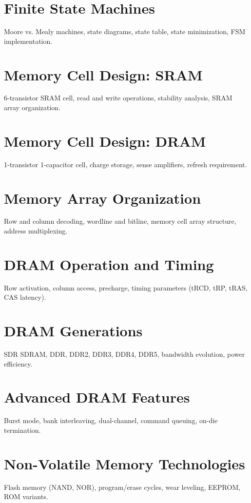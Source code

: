 \chapter{Finite State Machines}
Moore vs. Mealy machines, state diagrams, state table, state minimization, FSM implementation.


\chapter{Memory Cell Design: SRAM}
6-transistor SRAM cell, read and write operations, stability analysis, SRAM array organization.

\chapter{Memory Cell Design: DRAM}
1-transistor 1-capacitor cell, charge storage, sense amplifiers, refresh requirement.

\chapter{Memory Array Organization}
Row and column decoding, wordline and bitline, memory cell array structure, address multiplexing.

\chapter{DRAM Operation and Timing}
Row activation, column access, precharge, timing parameters (tRCD, tRP, tRAS, CAS latency).

\chapter{DRAM Generations}
SDR SDRAM, DDR, DDR2, DDR3, DDR4, DDR5, bandwidth evolution, power efficiency.

\chapter{Advanced DRAM Features}
Burst mode, bank interleaving, dual-channel, command queuing, on-die termination.

\chapter{Non-Volatile Memory Technologies}
Flash memory (NAND, NOR), program/erase cycles, wear leveling, EEPROM, ROM variants.

